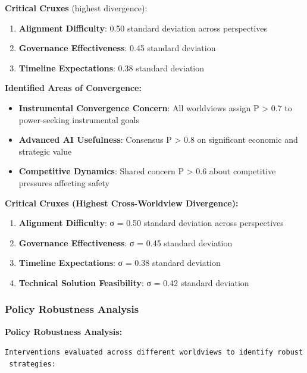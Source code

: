 \documentclass[
  11pt,
  letterpaper,
]{book}
\providecommand{\tightlist}{%
  \setlength{\itemsep}{0pt}\setlength{\parskip}{0pt}}
\begin{document}
\textbf{Critical Cruxes} (highest divergence):

\begin{enumerate}
\def\labelenumi{\arabic{enumi}.}
\tightlist
\item
  \textbf{Alignment Difficulty}: 0.50 standard deviation across
  perspectives
\item
  \textbf{Governance Effectiveness}: 0.45 standard deviation
\item
  \textbf{Timeline Expectations}: 0.38 standard deviation
\end{enumerate}

\textbf{Identified Areas of Convergence:}

\begin{itemize}
\tightlist
\item
  \textbf{Instrumental Convergence Concern}: All worldviews assign P
  \textgreater{} 0.7 to power-seeking instrumental goals
\item
  \textbf{Advanced AI Usefulness}: Consensus P \textgreater{} 0.8 on
  significant economic and strategic value
\item
  \textbf{Competitive Dynamics}: Shared concern P \textgreater{} 0.6
  about competitive pressures affecting safety
\end{itemize}

\textbf{Critical Cruxes (Highest Cross-Worldview Divergence):}

\begin{enumerate}
\def\labelenumi{\arabic{enumi}.}
\tightlist
\item
  \textbf{Alignment Difficulty}: σ = 0.50 standard deviation across
  perspectives
\item
  \textbf{Governance Effectiveness}: σ = 0.45 standard deviation
\item
  \textbf{Timeline Expectations}: σ = 0.38 standard deviation
\item
  \textbf{Technical Solution Feasibility}: σ = 0.42 standard deviation
\end{enumerate}

\subsubsection{Policy Robustness Analysis}\label{sec-policy-robustness}

\textbf{Policy Robustness Analysis:}

\texttt{Interventions\ evaluated\ across\ different\ worldviews\ to\ identify\ robust\ strategies:}
\end{document}
